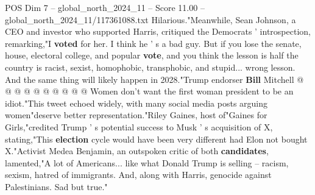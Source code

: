 \begin{textsample}{POS Dim 7 – global\_north\_2024\_11 – Score 11.00 – global\_north\_2024\_11/117361088.txt}
Hilarious."Meanwhile, Sean Johnson, a CEO and investor who supported Harris, critiqued the Democrats ' introspection, remarking,"I \textbf{voted} for her.
I think he ' s a bad guy.
But if you lose the senate, house, electoral college, and popular \textbf{vote}, and you think the lesson is half the country is racist, sexist, homophobic, transphobic, and stupid... wrong lesson.
And the same thing will likely happen in 2028."Trump endorser \textbf{Bill} Mitchell @ @ @ @ @ @ @ @ @ @ Women don't want the first woman president to be an idiot."This tweet echoed widely, with many social media posts arguing women"deserve better representation."Riley Gaines, host of"Gaines for Girls,"credited Trump ' s potential success to Musk ' s acquisition of X, stating,"This \textbf{election} cycle would have been very different had Elon not bought X."Activist Medea Benjamin, an outspoken critic of both \textbf{candidates}, lamented,"A lot of Americans... like what Donald Trump is selling -- racism, sexism, hatred of immigrants.
And, along with Harris, genocide against Palestinians.
Sad but true."

\end{textsample}
